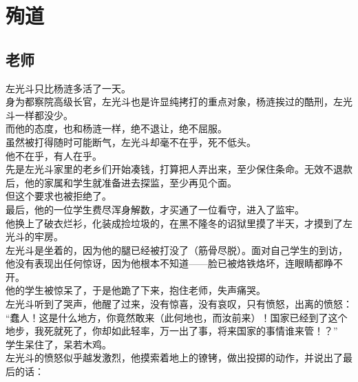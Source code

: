 \section{殉道}
\ifnum{}
	\begin{multicols}{\theparacolNo}
\fi
\subsection{老师}
左光斗只比杨涟多活了一天。\\

身为都察院高级长官，左光斗也是许显纯拷打的重点对象，杨涟挨过的酷刑，左光斗一样都没少。\\

而他的态度，也和杨涟一样，绝不退让，绝不屈服。\\

虽然被打得随时可能断气，左光斗却毫不在乎，死不低头。\\

他不在乎，有人在乎。\\

先是左光斗家里的老乡们开始凑钱，打算把人弄出来，至少保住条命。无效不退款后，他的家属和学生就准备进去探监，至少再见个面。\\

但这个要求也被拒绝了。\\

最后，他的一位学生费尽浑身解数，才买通了一位看守，进入了监牢。\\

他换上了破衣烂衫，化装成捡垃圾的，在黑不隆冬的诏狱里摸了半天，才摸到了左光斗的牢房。\\

左光斗是坐着的，因为他的腿已经被打没了（筋骨尽脱）。面对自己学生的到访，他没有表现出任何惊讶，因为他根本不知道——脸已被烙铁烙坏，连眼睛都睁不开。\\

他的学生被惊呆了，于是他跪了下来，抱住老师，失声痛哭。\\

左光斗听到了哭声，他醒了过来，没有惊喜，没有哀叹，只有愤怒，出离的愤怒：\\

“蠢人！这是什么地方，你竟然敢来（此何地也，而汝前来）！国家已经到了这个地步，我死就死了，你却如此轻率，万一出了事，将来国家的事情谁来管！？”\\

学生呆住了，呆若木鸡。\\

左光斗的愤怒似乎越发激烈，他摸索着地上的镣铐，做出投掷的动作，并说出了最后的话：\\


\end{multicols}
